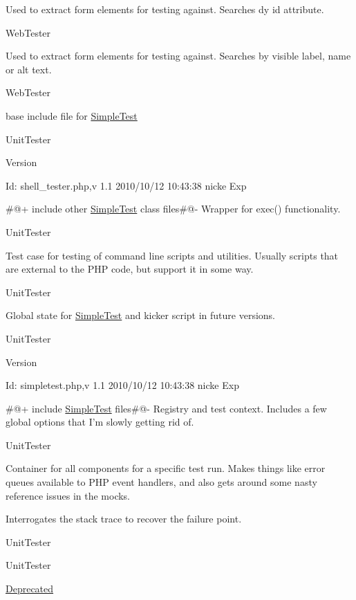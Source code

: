 Used to extract form elements for testing against. Searches dy id attribute.

WebTester

Used to extract form elements for testing against. Searches by visible label, name or alt text.

WebTester

base include file for \hyperlink{class_simple_test}{SimpleTest}

UnitTester \begin{DoxyVersion}{Version}

\end{DoxyVersion}
\begin{DoxyParagraph}{Id:}
shell\_\-tester.php,v 1.1 2010/10/12 10:43:38 nicke Exp 
\end{DoxyParagraph}


\#@+ include other \hyperlink{class_simple_test}{SimpleTest} class files\#@-\/ Wrapper for exec() functionality.

UnitTester

Test case for testing of command line scripts and utilities. Usually scripts that are external to the PHP code, but support it in some way.

UnitTester

Global state for \hyperlink{class_simple_test}{SimpleTest} and kicker script in future versions.

UnitTester \begin{DoxyVersion}{Version}

\end{DoxyVersion}
\begin{DoxyParagraph}{Id:}
simpletest.php,v 1.1 2010/10/12 10:43:38 nicke Exp 
\end{DoxyParagraph}


\#@+ include \hyperlink{class_simple_test}{SimpleTest} files\#@-\/ Registry and test context. Includes a few global options that I'm slowly getting rid of.

UnitTester

Container for all components for a specific test run. Makes things like error queues available to PHP event handlers, and also gets around some nasty reference issues in the mocks.

Interrogates the stack trace to recover the failure point.

UnitTester

UnitTester \begin{Desc}
\item[\hyperlink{deprecated__deprecated000006}{Deprecated}]\end{Desc}


